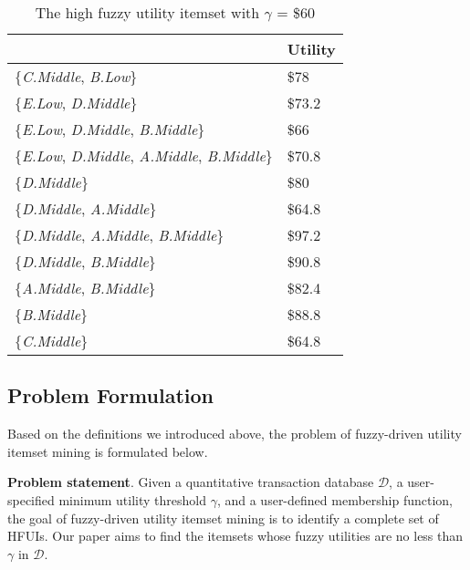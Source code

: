 \documentclass[journal]{IEEEtran}
\begin{document}
\begin{table}[!h]
	\begin{center}
		\caption{The high fuzzy utility itemset with $\gamma$ = \$60}
		\label{tab:HFUIs}
		\begin{tabular}{|l|l|}
			\hline
			\makebox[4cm][c]{\textbf{Fuzzy itemset}} & \textbf{Utility} \\ \hline
			$\{$\textit{C.Middle}, \textit{B.Low}$\}$ & \$78 \\ \hline
			$\{$\textit{E.Low}, \textit{D.Middle}$\}$ & \$73.2  \\ \hline
			$\{$\textit{E.Low}, \textit{D.Middle}, \textit{B.Middle}$\}$ & \$66 \\ \hline
			$\{$\textit{E.Low}, \textit{D.Middle}, \textit{A.Middle}, \textit{B.Middle}$\}$ & \$70.8 \\ \hline
			$\{$\textit{D.Middle}$\}$ & \$80 \\ \hline
			$\{$\textit{D.Middle}, \textit{A.Middle}$\}$ & \$64.8 \\ \hline
			$\{$\textit{D.Middle}, \textit{A.Middle}, \textit{B.Middle}$\}$ & \$97.2 \\ \hline
			$\{$\textit{D.Middle}, \textit{B.Middle}$\}$ & \$90.8  \\ \hline
			$\{$\textit{A.Middle}, \textit{B.Middle}$\}$ & \$82.4 \\ \hline
			$\{$\textit{B.Middle}$\}$ & \$88.8  \\ \hline
			$\{$\textit{C.Middle}$\}$ & \$64.8 \\
			\hline
		\end{tabular}
	\end{center}
\end{table}

\subsection{Problem Formulation}

Based on the definitions we introduced above, the problem of fuzzy-driven utility itemset mining is formulated below.

\textbf{Problem statement}. Given a quantitative transaction database $\mathcal{D}$, a user-specified minimum utility threshold $\gamma$, and a user-defined membership function, the goal of fuzzy-driven utility itemset mining is to identify a complete set of HFUIs. Our paper aims to find the itemsets whose fuzzy utilities are no less than $\gamma$ in $\mathcal{D}$.
\end{document}
